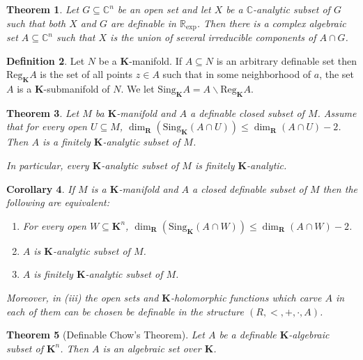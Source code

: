 \documentclass{amsart}
\newtheorem{theorem}{Theorem}[subsection]
\newtheorem{corollary}[theorem]{Corollary}
\theoremstyle{definition}
\newtheorem{definition}[theorem]{Definition}
\numberwithin{equation}{section}
\begin{document}
\begin{theorem}
  Let $G \subseteq \mathbb{C}^n$ be an open set and let $X$ be a $\mathbb{C}$-analytic subset of $G$ such that both $X$ and $G$ are definable in $\mathbb{R}_{\exp}$.
  Then there is a complex algebraic set $A \subseteq \mathbb{C}^n$ such that $X$ is the union of several irreducible components of $A\cap G$.
\end{theorem}

\begin{definition}
  Let $N$ be a $\mathbf{K}$-manifold.
  If $A \subseteq N$ is an arbitrary definable set then $\mathrm{Reg}_{\mathbf{K}}A$ is the set of all points $z \in A$ such that in some neighborhood of $a$,
  the set $A$ is a $\mathbf{K}$-submanifold of $N$.
  We let $\mathrm{Sing}_{\mathbf{K}}A = A \backslash \mathrm{Reg}_{\mathbf{K}}A$.
\end{definition}

\begin{theorem}
  Let $M$ ba $\mathbf{K}$-manifold and $A$ a definable closed subset of $M$.
  Assume that for every open $U \subseteq M$,
  $\dim_{\mathbf{R}}(\mathrm{Sing}_{\mathbf{K}}(A\cap U)) \le \dim_{\mathbf{R}}(A\cap U) -2$.
  Then $A$ is a finitely $\mathbf{K}$-analytic subset of $M$.

  In particular, every $\mathbf{K}$-analytic subset of $M$ is finitely $\mathbf{K}$-analytic.
\end{theorem}

\begin{corollary}
If $M$ is a $\mathbf{K}$-manifold and $A$ a closed definable subset of $M$ then the following are equivalent:
\begin{enumerate}[label = (\roman*)]
  \item For every open $W \subseteq \mathbf{K}^n$, $\dim_{\mathbf{R}}(\mathrm{Sing}_{\mathbf{K}}(A\cap W)) \le \dim_{\mathbf{R}}(A\cap W) -2$.
  \item $A$ is $\mathbf{K}$-analytic subset of $M$.
  \item $A$ is finitely $\mathbf{K}$-analytic subset of $M$.
\end{enumerate}
Moreover, in (iii) the open sets and $\mathbf{K}$-holomorphic functions which carve $A$ in each of them can be chosen be definable in the structure $(R,<,+,\cdot,A)$.
\end{corollary}

\begin{theorem}[Definable Chow's Theorem]
  Let $A$ be a definable $\mathbf{K}$-algebraic subset of $\mathbf{K}^n$.
  Then $A$ is an algebraic set over $\mathbf{K}$.
\end{theorem}
\end{document}
